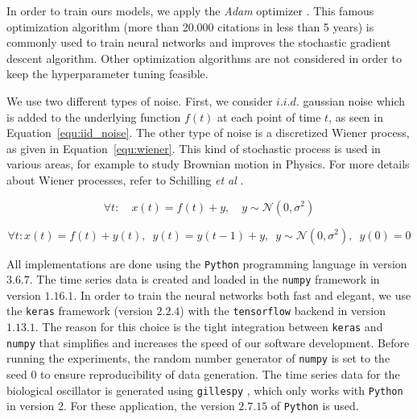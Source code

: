 In order to train ours models, we apply the \emph{Adam} optimizer
\cite{kingma2014}. This famous optimization algorithm (more than 20.000
citations in less than 5 years) is commonly used to train neural networks and
improves the stochastic gradient descent algorithm. Other optimization
algorithms are not considered in order to keep the hyperparameter tuning
feasible.

We use two different types of noise. First, we consider $i.i.d.$ gaussian
noise which is added to the underlying function $f(t)$ at each point of time 
$t$,
as seen in Equation~\ref{equ:iid_noise}. The other type of noise is a
discretized Wiener process, as given in Equation~\ref{equ:wiener}.
This kind of stochastic process is used in various areas,
for example to study Brownian motion in Physics.
For more details about Wiener processes, refer to Schilling
\textit{et al} \cite{schilling2014}.

\begin{equation}
    \forall t: \quad x(t) = f(t) + y, \quad y \sim \mathcal{N}(0, \sigma^2)
    \label{equ:iid_noise}
\end{equation}

\begin{equation}
    \forall t: x(t) = f(t) + y(t), \enspace y(t) = y(t-1) + y, \enspace
        y \sim \mathcal{N}(0, \sigma^2), \enspace y(0) = 0
    \label{equ:wiener}
\end{equation}

All implementations are done using the \texttt{Python} programming language in
version $3.6.7$. The time series data is created and loaded in the
\texttt{numpy} framework in version $1.16.1$. In order to train the neural
networks both fast and elegant, we use the \texttt{keras} framework 
(version $2.2.4$) with the
\texttt{tensorflow} backend in version $1.13.1$.
The reason for this choice is the tight
integration between \texttt{keras} and \texttt{numpy} that simplifies and
increases the speed of our software development. Before running the experiments,
the random number generator of \texttt{numpy} is set to the seed $0$ to ensure
reproducibility of data generation.
The time series data for the biological oscillator
is generated using \texttt{gillespy} \cite{abel2016}, which only works with 
\texttt{Python} in version 2. For these application,
the version $2.7.15$ of \texttt{Python} is used.
